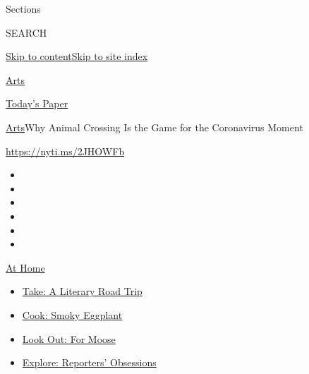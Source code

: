 Sections

SEARCH

\protect\hyperlink{site-content}{Skip to
content}\protect\hyperlink{site-index}{Skip to site index}

\href{https://www.nytimes3xbfgragh.onion/section/arts}{Arts}

\href{https://myaccount.nytimes3xbfgragh.onion/auth/login?response_type=cookie\&client_id=vi}{}

\href{https://www.nytimes3xbfgragh.onion/section/todayspaper}{Today's
Paper}

\href{/section/arts}{Arts}\textbar{}Why Animal Crossing Is the Game for
the Coronavirus Moment

\url{https://nyti.ms/2JHOWFb}

\begin{itemize}
\item
\item
\item
\item
\item
\item
\end{itemize}

\href{https://www.nytimes3xbfgragh.onion/spotlight/at-home?action=click\&pgtype=Article\&state=default\&region=TOP_BANNER\&context=at_home_menu}{At
Home}

\begin{itemize}
\tightlist
\item
  \href{https://www.nytimes3xbfgragh.onion/2020/07/28/books/time-for-a-literary-road-trip.html?action=click\&pgtype=Article\&state=default\&region=TOP_BANNER\&context=at_home_menu}{Take:
  A Literary Road Trip}
\item
  \href{https://www.nytimes3xbfgragh.onion/2020/07/29/magazine/bored-with-your-home-cooking-some-smoky-eggplant-will-fix-that.html?action=click\&pgtype=Article\&state=default\&region=TOP_BANNER\&context=at_home_menu}{Cook:
  Smoky Eggplant}
\item
  \href{https://www.nytimes3xbfgragh.onion/2020/07/27/travel/moose-michigan-isle-royale.html?action=click\&pgtype=Article\&state=default\&region=TOP_BANNER\&context=at_home_menu}{Look
  Out: For Moose}
\item
  \href{https://www.nytimes3xbfgragh.onion/interactive/2020/at-home/even-more-reporters-editors-diaries-lists-recommendations.html?action=click\&pgtype=Article\&state=default\&region=TOP_BANNER\&context=at_home_menu}{Explore:
  Reporters' Obsessions}
\end{itemize}


